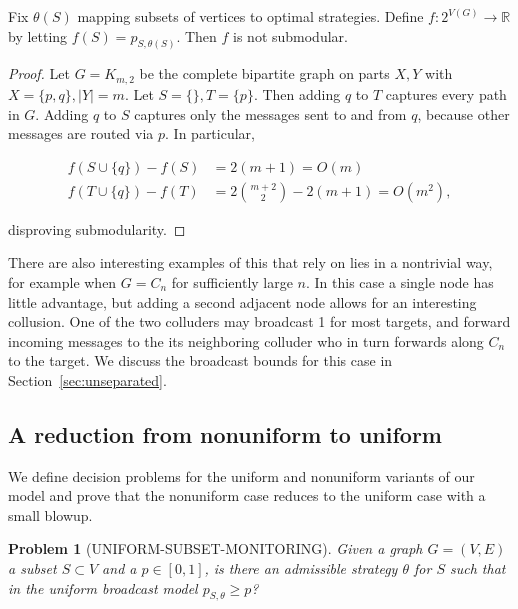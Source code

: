 \documentclass[prodmode,acmec]{ec-acmsmall}
\newtheorem{problem}{Problem}
\begin{document}
\begin{proposition} \label{prop:not-submodular}

Fix $\theta(S)$ mapping subsets of vertices to optimal strategies. Define $f:
2^{V(G)} \to \mathbb{R}$ by letting $f(S) = p_{S, \theta(S)}$. Then $f$ is not
submodular. 

\end{proposition}

\begin{proof}

Let $G = K_{m,2}$ be the complete bipartite graph on parts $X,Y$ with $X = \{
p,q \}, |Y|=m$. Let $S = \{ \}, T = \{ p \}$. Then adding $q$ to $T$ captures
every path in $G$. Adding $q$ to $S$ captures only the messages sent to and
from $q$, because other messages are routed via $p$. In particular,

\begin{align*}
   f(S \cup \{ q \}) - f(S) &= 2(m+1) = O(m) \\ 
   f(T \cup \{ q \}) - f(T) &= 2 \binom{m+2}{2} - 2(m+1) = O(m^2),
\end{align*}

disproving submodularity. 
\end{proof}

There are also interesting examples of this that rely on lies in a nontrivial
way, for example when $G = C_n$ for sufficiently large $n$. In this case a
single node has little advantage, but adding a second adjacent node allows for
an interesting collusion. One of the two colluders may broadcast 1 for most
targets, and forward incoming messages to the its neighboring colluder who in
turn forwards along $C_n$ to the target. We discuss the broadcast bounds for
this case in Section~\ref{sec:unseparated}.

\subsection{A reduction from nonuniform to uniform} \label{sec:reduction}

We define decision problems for the uniform and nonuniform variants of our
model and prove that the nonuniform case reduces to the uniform case with a
small blowup.

\begin{problem}[UNIFORM-SUBSET-MONITORING]

Given a graph $G = (V,E)$ a subset $S \subset V$ and a $p \in [0,1]$, is there
an admissible strategy $\theta$ for $S$ such that in the uniform broadcast
model $p_{S, \theta} \geq p$?

\end{problem} 
 
\end{document}
